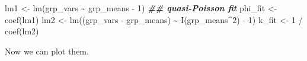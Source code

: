 \documentclass[
  12pt,
]{book}
\newenvironment{Shaded}{\begin{snugshade}}{\end{snugshade}}
\newcommand{\DecValTok}[1]{\textcolor[rgb]{0.00,0.00,0.81}{#1}}
\newcommand{\DocumentationTok}[1]{\textcolor[rgb]{0.56,0.35,0.01}{\textbf{\textit{#1}}}}
\newcommand{\FunctionTok}[1]{\textcolor[rgb]{0.00,0.00,0.00}{#1}}
\newcommand{\NormalTok}[1]{#1}
\newcommand{\OtherTok}[1]{\textcolor[rgb]{0.56,0.35,0.01}{#1}}
\newcommand{\SpecialCharTok}[1]{\textcolor[rgb]{0.00,0.00,0.00}{#1}}
\begin{document}
\begin{Shaded}
\begin{Highlighting}[]
\NormalTok{lm1 }\OtherTok{\textless{}{-}} \FunctionTok{lm}\NormalTok{(grp\_vars }\SpecialCharTok{\textasciitilde{}}\NormalTok{ grp\_means }\SpecialCharTok{{-}} \DecValTok{1}\NormalTok{) }\DocumentationTok{\#\# \textasciigrave{}quasi{-}Poisson\textquotesingle{} fit}
\NormalTok{phi\_fit }\OtherTok{\textless{}{-}} \FunctionTok{coef}\NormalTok{(lm1)}
\NormalTok{lm2 }\OtherTok{\textless{}{-}} \FunctionTok{lm}\NormalTok{((grp\_vars }\SpecialCharTok{{-}}\NormalTok{ grp\_means) }\SpecialCharTok{\textasciitilde{}} \FunctionTok{I}\NormalTok{(grp\_means}\SpecialCharTok{\^{}}\DecValTok{2}\NormalTok{) }\SpecialCharTok{{-}} \DecValTok{1}\NormalTok{)}
\NormalTok{k\_fit }\OtherTok{\textless{}{-}} \DecValTok{1} \SpecialCharTok{/} \FunctionTok{coef}\NormalTok{(lm2)}
\end{Highlighting}
\end{Shaded}

Now we can plot them.
\end{document}
